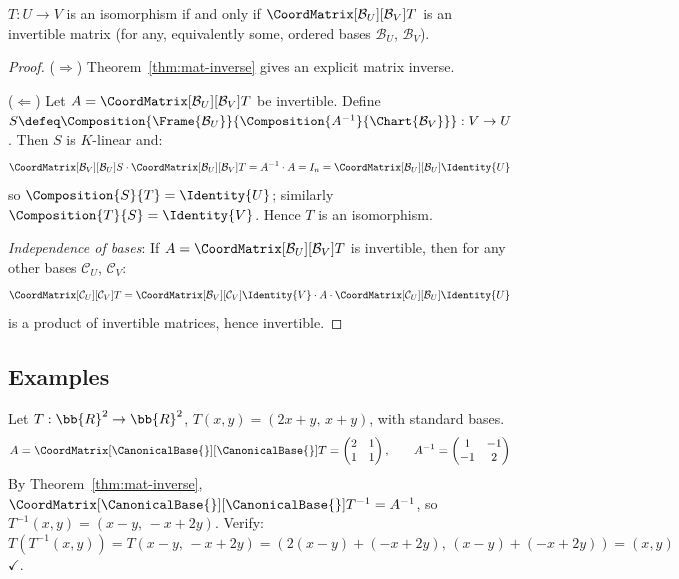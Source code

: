 \begin{corollary}
\label{cor:invertible-iff-mat-invertible}
    $T: U \to V$ is an isomorphism if and only if
    $\CoordMatrix[\mathcal{B}_U][\mathcal{B}_V]{T}$ is an invertible matrix (for any,
    equivalently some, ordered bases $\mathcal{B}_U$, $\mathcal{B}_V$).
\end{corollary}

\begin{proof}
    ($\Rightarrow$) Theorem~\ref{thm:mat-inverse} gives an explicit matrix inverse.

    ($\Leftarrow$) Let $A = \CoordMatrix[\mathcal{B}_U][\mathcal{B}_V]{T}$ be invertible.
    Define $S \defeq \Composition{\Frame{\mathcal{B}_U}}
    {\Composition{A^{-1}}{\Chart{\mathcal{B}_V}}}: V \to U$.
    Then $S$ is $K$-linear and:
    \[
        \CoordMatrix[\mathcal{B}_V][\mathcal{B}_U]{S}
        \cdot \CoordMatrix[\mathcal{B}_U][\mathcal{B}_V]{T}
        = A^{-1} \cdot A = I_n
        = \CoordMatrix[\mathcal{B}_U][\mathcal{B}_U]{\Identity{U}}
    \]
    so $\Composition{S}{T} = \Identity{U}$; similarly $\Composition{T}{S} = \Identity{V}$.
    Hence $T$ is an isomorphism.

    \textit{Independence of bases}: If $A = \CoordMatrix[\mathcal{B}_U][\mathcal{B}_V]{T}$
    is invertible, then for any other bases $\mathcal{C}_U$, $\mathcal{C}_V$:
    \[
        \CoordMatrix[\mathcal{C}_U][\mathcal{C}_V]{T}
        = \CoordMatrix[\mathcal{B}_V][\mathcal{C}_V]{\Identity{V}}
          \cdot A
          \cdot \CoordMatrix[\mathcal{C}_U][\mathcal{B}_U]{\Identity{U}}
    \]
    is a product of invertible matrices, hence invertible. \qedhere
\end{proof}

\subsection{Examples}

\begin{example}
\label{ex:mat-inverse}
    Let $T: \bb{R}^2 \to \bb{R}^2$, $T(x,y) = (2x+y,\, x+y)$, with standard bases.
    \[
        A = \CoordMatrix[\CanonicalBase{}][\CanonicalBase{}]{T}
        = \begin{pmatrix} 2 & 1 \\ 1 & 1 \end{pmatrix},
        \qquad
        A^{-1} = \begin{pmatrix} 1 & -1 \\ -1 & 2 \end{pmatrix}
    \]
    By Theorem~\ref{thm:mat-inverse},
    $\CoordMatrix[\CanonicalBase{}][\CanonicalBase{}]{T^{-1}} = A^{-1}$, so
    $T^{-1}(x,y) = (x-y,\, -x+2y)$.
    Verify: $T(T^{-1}(x,y)) = T(x-y,\, -x+2y) = (2(x-y)+(-x+2y),\, (x-y)+(-x+2y))
    = (x, y)$ $\checkmark$.
\end{example}

